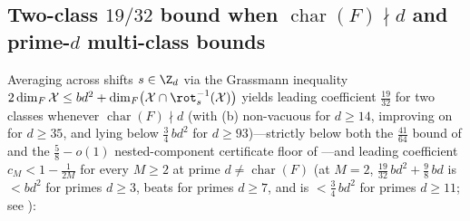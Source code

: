 \subsection{Two-class \texorpdfstring{$19/32$}{19/32} bound when \texorpdfstring{$\operatorname{char}(F) \nmid d$}{char(F) does not divide d} and prime-\texorpdfstring{$d$}{d} multi-class bounds}\label{sec:19-32}

Averaging  across shifts $s \in \Z_d$ via the Grassmann inequality
$2\dim_F \mathcal{X} \le b d^2 + \dim_F\bigl(\mathcal{X} \cap \rot_s^{-1}(\mathcal{X})\bigr)$ yields
leading coefficient $\frac{19}{32}$ for two classes whenever $\operatorname{char}(F) \nmid d$
(with (b) non-vacuous for $d \ge 14$, improving on
\cite[Theorem~3.5]{SharedDecoders2026} for $d \ge 35$, and lying below $\frac{3}{4}\,b d^2$ for
$d \ge 93$)---strictly below both the $\frac{41}{64}$ bound of
\cite[Theorem~3.4]{SharedDecoders2026} and the $\frac{5}{8} - o(1)$
nested-component certificate floor of \cite[Theorem~C.6]{SharedDecoders2026}---and leading coefficient
$c_M < 1 - \frac{1}{2M}$ for every $M \ge 2$ at prime $d \ne \operatorname{char}(F)$ (at $M = 2$,
$\frac{19}{32}\,b d^2 + \frac{9}{8}\,b d$ is $< b d^2$ for primes $d \ge 3$, beats
\cite[Theorem~3.5]{SharedDecoders2026} for primes $d \ge 7$, and is $< \frac{3}{4}\,b d^2$ for primes
$d \ge 11$; see ):

